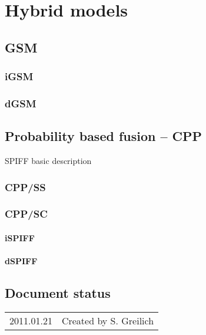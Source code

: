 \chapter{Hybrid models}



\section{GSM}
\subsection{iGSM}
\subsection{dGSM}

\section{Probability based fusion -- CPP}
SPIFF basic description
\subsection{CPP/SS}
\subsection{CPP/SC}
\subsubsection{iSPIFF}
\subsubsection{dSPIFF}

\section*{Document status}
\begin{tabular}{l l}
2011.01.21&Created by S. Greilich
\end{tabular} 